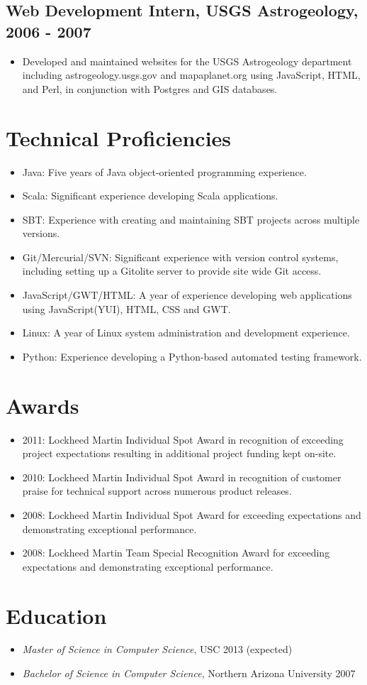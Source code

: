 \documentclass[11pt]{article}
\begin{document}
\subsection*{Web Development Intern, USGS Astrogeology, 2006 - 2007}
\label{sec-1.2}

\begin{itemize}
\item Developed and maintained websites for the USGS Astrogeology department including astrogeology.usgs.gov and mapaplanet.org using JavaScript, HTML, and Perl, in conjunction with Postgres and GIS databases.
\end{itemize}
\section*{Technical Proficiencies}
\label{sec-2}

\begin{itemize}
\item Java: Five years of Java object-oriented programming experience.
\item Scala: Significant experience developing Scala applications.
\item SBT: Experience with creating and maintaining SBT projects across multiple versions.
\item Git/Mercurial/SVN: Significant experience with version control systems, including setting up a Gitolite server to provide site wide Git access.
\item JavaScript/GWT/HTML: A year of experience developing web applications using JavaScript(YUI), HTML, CSS and GWT.
\item Linux: A year of Linux system administration and development experience.
\item Python: Experience developing a Python-based automated testing framework.
\end{itemize}
\section*{Awards}
\label{sec-3}

\begin{itemize}
\item 2011: Lockheed Martin Individual Spot Award in recognition of exceeding project expectations resulting in additional project funding kept on-site.
\item 2010: Lockheed Martin Individual Spot Award in recognition of customer praise for technical support across numerous product releases.
\item 2008: Lockheed Martin Individual Spot Award for exceeding expectations and demonstrating exceptional performance.
\item 2008: Lockheed Martin Team Special Recognition Award for exceeding expectations and demonstrating exceptional performance.
\end{itemize}
\section*{Education}
\label{sec-4}

\begin{itemize}
\item \emph{Master of Science in Computer Science}, USC 2013 (expected)
\item \emph{Bachelor of Science in Computer Science}, Northern Arizona University 2007
\end{itemize}
\end{document}
